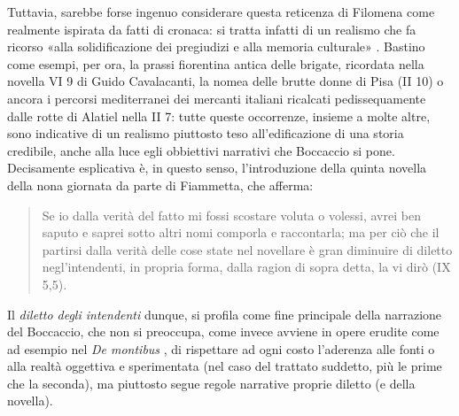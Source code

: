 Tuttavia, sarebbe forse ingenuo considerare questa reticenza di Filomena
come realmente ispirata da fatti di cronaca: si tratta infatti di un
realismo che fa ricorso «alla solidificazione dei pregiudizi e alla
memoria culturale» \autocite[p.~97]{surdich2008boccaccio}. Bastino come
esempi, per ora, la prassi fiorentina antica delle brigate, ricordata
nella novella VI 9 di Guido Cavalacanti, la nomea delle brutte donne di
Pisa (II 10) o ancora i percorsi mediterranei dei mercanti italiani
ricalcati pedissequamente dalle rotte di Alatiel nella II 7: tutte
queste occorrenze, insieme a molte altre, sono indicative di un realismo
piuttosto teso all'edificazione di una storia credibile, anche alla luce
egli obbiettivi narrativi che Boccaccio si pone. Decisamente esplicativa
è, in questo senso, l'introduzione della quinta novella della nona
giornata da parte di Fiammetta, che afferma:

\begin{quote}
Se io dalla verità del fatto mi fossi scostare voluta o volessi, avrei
ben saputo e saprei sotto altri nomi comporla e raccontarla; ma per ciò
che il partirsi dalla verità delle cose state nel novellare è gran
diminuire di diletto negl'intendenti, in propria forma, dalla ragion di
sopra detta, la vi dirò (IX 5,5).
\end{quote}

Il \emph{diletto degli intendenti} dunque, si profila come fine
principale della narrazione del Boccaccio, che non si preoccupa, come
invece avviene in opere erudite come ad esempio nel \emph{De montibus}
\autocite{demontibus}, di rispettare ad ogni costo l'aderenza alle fonti
o alla realtà oggettiva e sperimentata (nel caso del trattato suddetto,
più le prime che la seconda), ma piuttosto segue regole narrative
proprie diletto (e della novella).

